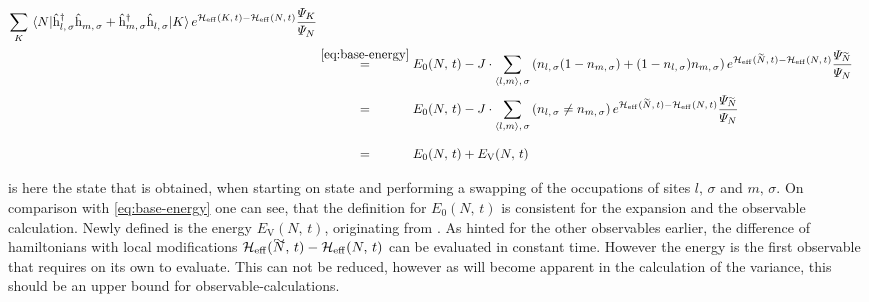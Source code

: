 \begin{equation}
\begin{split}
        \lsum[K] \bracketHelper{N}{ \withspinhcop{l}{\sigma}{\dagger} \withspinhcop{m}{\sigma}{} + \withspinhcop{m}{\sigma}{\dagger} \withspinhcop{l}{\sigma}{} }{K} e^{\HeffOft[K]-\HeffOft[N]}
        \frac{
            \psiN[K]
        }{
            \psiN[N]
        }\\
        &\stackrel{\ref{eq:base-energy}}{=} E_0(N,\,t)-
        J \cdot \neighborsumWSpin{l}{m}{\sigma}
        \left(n_{l,\,\sigma} (1- n_{m,\,\sigma}) + (1-n_{l,\,\sigma}) n_{m,\,\sigma}\right)
         e^{\HeffOft[\vphantom{N}\smash{\tilde{N}}]-\HeffOft[N]}
        \frac{
            \psiN[\vphantom{N}\smash{\tilde{N}}]
        }{
            \psiN[N]
        }\\
        &\stackrel{\phantom{\ref{eq:base-energy}}}{=} E_0(N,\,t)-
        J \cdot \neighborsumWSpin{l}{m}{\sigma}
        \left(n_{l,\,\sigma} \neq n_{m,\,\sigma}\right)
         e^{\HeffOft[\vphantom{N}\smash{\tilde{N}}]-\HeffOft[N]}
        \frac{
            \psiN[\vphantom{N}\smash{\tilde{N}}]
        }{
            \psiN[N]
        }\\
        &\stackrel{\phantom{\ref{eq:base-energy}}}{=} E_0(N,\,t) + E_\text{V}(N,\,t)
    \end{split}
\end{equation}

 is here the state that is obtained, when starting on state \ketN and performing a swapping of the occupations of sites $l,\,\sigma$ and $m,\,\sigma$.
On comparison with \autoref{eq:base-energy} one can see, that the definition for $E_0(N,\,t)$ is consistent for the expansion and the observable calculation.
Newly defined is the energy $E_\text{V}(N,\,t)$, originating from \Vhamiltonian[].
As hinted for the other observables earlier, the difference of hamiltonians with local modifications $\HeffOft[\vphantom{N}\smash{\tilde{N}}]-\HeffOft[N]$ can be evaluated in constant time.
However the energy is the first observable that requires  on its own to evaluate. This can not be reduced, however as will become apparent in the calculation of the variance, this should be an upper bound for observable-calculations.

